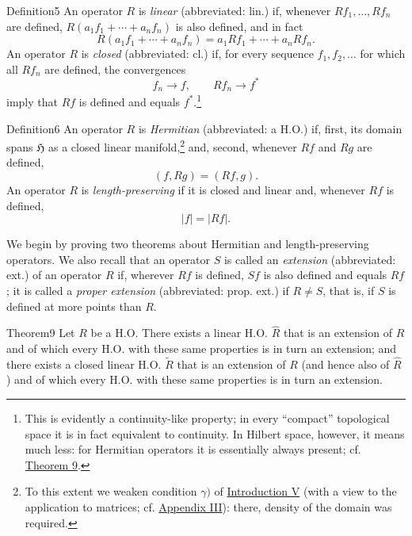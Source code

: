 ﻿\documentclass[paper=b5,fontsize=13pt,bookmarkpackage=false,twoside]{scrartcl}
\begin{document}
\begin{namedstatement}{Definition}{5}\label{def:5}
An operator $R$ is \emph{linear} (abbreviated: lin.) if, whenever $Rf_1,\ldots,Rf_n$ are defined, $R(a_1f_1+\cdots+a_nf_n)$ is also defined, and in fact
\[
R(a_1f_1+\cdots+a_nf_n)=a_1Rf_1+\cdots+a_nRf_n.
\]
An operator $R$ is \emph{closed} (abbreviated: cl.) if, for every sequence $f_1,f_2,\ldots$ for which all $Rf_n$ are defined, the convergences
\[
f_n\longrightarrow f,\qquad Rf_n\longrightarrow f^*
\]
imply that $Rf$ is defined and equals $f^*$.\footnote{\label{fn:29}This is evidently a continuity-like property; in every ``compact'' topological space it is in fact equivalent to continuity. In Hilbert space, however, it means much less: for Hermitian operators it is essentially always present; cf. \hyperref[thm:9]{Theorem 9}.}
\end{namedstatement}

\begin{namedstatement}{Definition}{6}\label{def:6}
An operator $R$ is \emph{Hermitian} (abbreviated: a H.O.) if, first, its domain spans $\mathfrak H$ as a closed linear manifold,\footnote{\label{fn:30}To this extent we weaken condition $\gamma)$ of \hyperref[intro:V]{Introduction V} (with a view to the application to matrices; cf. \hyperref[app:III]{Appendix III}): there, density of the domain was required.} and, second, whenever $Rf$ and $Rg$ are defined,
\[
(f,Rg)=(Rf,g).
\]
An operator $R$ is \emph{length-preserving} if it is closed and linear and, whenever $Rf$ is defined,
\[
|f|=|Rf|.
\]
\end{namedstatement}

We begin by proving two theorems about Hermitian and length-preserving operators. We also recall that an operator $S$ is called an \emph{extension} (abbreviated: ext.) of an operator $R$ if, wherever $Rf$ is defined, $Sf$ is also defined and equals $Rf$; it is called a \emph{proper extension} (abbreviated: prop. ext.) if $R\ne S$, that is, if $S$ is defined at more points than $R$.

\begin{namedstatement}{Theorem}{9}\label{thm:9}
Let $R$ be a H.O. There exists a linear H.O. $\widehat R$ that is an extension of $R$ and of which every H.O. with these same properties is in turn an extension; and there exists a closed linear H.O. $\widetilde R$ that is an extension of $R$ (and hence also of $\widehat R$) and of which every H.O. with these same properties is in turn an extension.
\end{namedstatement}
\end{document}
